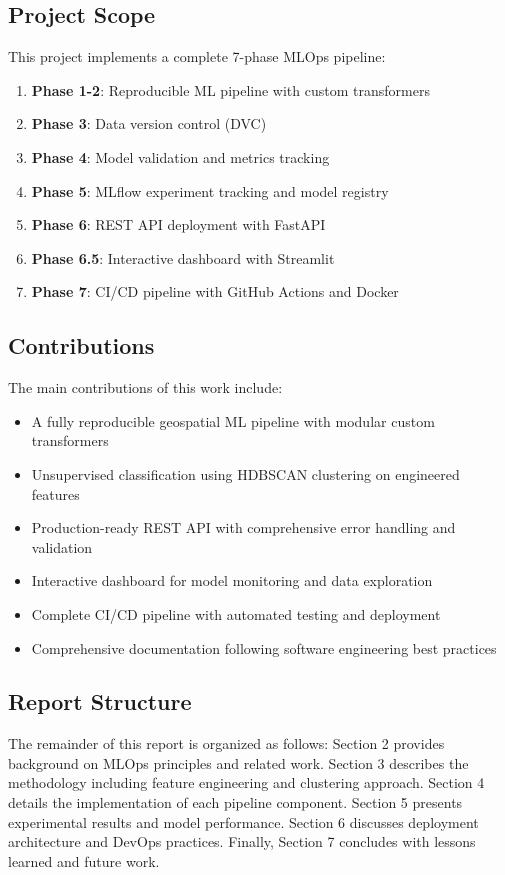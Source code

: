 \subsection{Project Scope}

This project implements a complete 7-phase MLOps pipeline:

\begin{enumerate}
    \item \textbf{Phase 1-2}: Reproducible ML pipeline with custom transformers
    \item \textbf{Phase 3}: Data version control (DVC)
    \item \textbf{Phase 4}: Model validation and metrics tracking
    \item \textbf{Phase 5}: MLflow experiment tracking and model registry
    \item \textbf{Phase 6}: REST API deployment with FastAPI
    \item \textbf{Phase 6.5}: Interactive dashboard with Streamlit
    \item \textbf{Phase 7}: CI/CD pipeline with GitHub Actions and Docker
\end{enumerate}

\subsection{Contributions}

The main contributions of this work include:

\begin{itemize}
    \item A fully reproducible geospatial ML pipeline with modular custom transformers
    \item Unsupervised classification using HDBSCAN clustering on engineered features
    \item Production-ready REST API with comprehensive error handling and validation
    \item Interactive dashboard for model monitoring and data exploration
    \item Complete CI/CD pipeline with automated testing and deployment
    \item Comprehensive documentation following software engineering best practices
\end{itemize}

\subsection{Report Structure}

The remainder of this report is organized as follows: Section 2 provides background on MLOps principles and related work. Section 3 describes the methodology including feature engineering and clustering approach. Section 4 details the implementation of each pipeline component. Section 5 presents experimental results and model performance. Section 6 discusses deployment architecture and DevOps practices. Finally, Section 7 concludes with lessons learned and future work.
